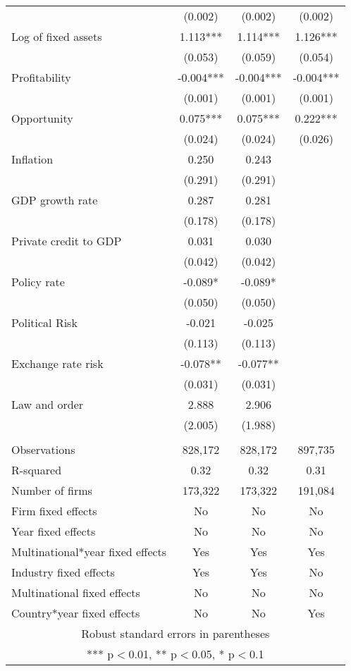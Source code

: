 \begin{tabular}{lccc}
 & (0.002) & (0.002) & (0.002) \\
Log of fixed assets & 1.113*** & 1.114*** & 1.126*** \\
 & (0.053) & (0.059) & (0.054) \\
Profitability & -0.004*** & -0.004*** & -0.004*** \\
 & (0.001) & (0.001) & (0.001) \\
Opportunity & 0.075*** & 0.075*** & 0.222*** \\
 & (0.024) & (0.024) & (0.026) \\
Inflation & 0.250 & 0.243 &  \\
 & (0.291) & (0.291) &  \\
GDP growth rate & 0.287 & 0.281 &  \\
 & (0.178) & (0.178) &  \\
Private credit to GDP & 0.031 & 0.030 &  \\
 & (0.042) & (0.042) &  \\
Policy rate & -0.089* & -0.089* &  \\
 & (0.050) & (0.050) &  \\
Political Risk & -0.021 & -0.025 &  \\
 & (0.113) & (0.113) &  \\
Exchange rate risk & -0.078** & -0.077** &  \\
 & (0.031) & (0.031) &  \\
Law and order & 2.888 & 2.906 &  \\
 & (2.005) & (1.988) &  \\
 &  &  &  \\
Observations & 828,172 & 828,172 & 897,735 \\
R-squared & 0.32 & 0.32 & 0.31 \\
Number of firms & 173,322 & 173,322 & 191,084 \\
Firm fixed effects & No & No & No \\
Year fixed effects & No & No & No \\
Multinational*year fixed effects & Yes & Yes & Yes \\
Industry fixed effects & Yes & Yes & No \\
Multinational fixed effects & No & No & No \\
 Country*year fixed effects & No & No & Yes \\ \hline
\multicolumn{4}{c}{ Robust standard errors in parentheses} \\
\multicolumn{4}{c}{ *** p$<$0.01, ** p$<$0.05, * p$<$0.1} \\
\end{tabular}
